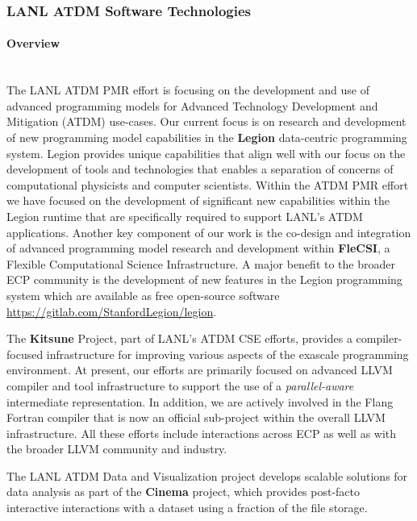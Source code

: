 \subsubsection{ LANL ATDM Software Technologies}

\paragraph{Overview} \leavevmode \\

The LANL ATDM PMR effort is focusing on the development and use of
advanced programming models for Advanced Technology Development and
Mitigation (ATDM) use-cases. Our current focus is on research and development
of new programming model capabilities in the \textbf{Legion} data-centric
programming system. Legion provides unique capabilities that align
well with our focus on the development of tools and technologies that
enables a separation of concerns of computational physicists and
computer scientists. Within the ATDM PMR effort we have focused on the
development of significant new capabilities within the Legion runtime
that are specifically required to support LANL's ATDM
applications. Another key component of our work is the co-design and
integration of advanced programming model research and development
within \textbf{FleCSI}, a Flexible Computational Science Infrastructure. A
major benefit to the broader ECP community is the development of new 
features in the Legion programming system which are available as free
open-source software \url{https://gitlab.com/StanfordLegion/legion}.  

The \textbf{Kitsune} Project, part of LANL's ATDM CSE efforts, provides a
compiler-focused infrastructure for improving various aspects of the
exascale programming environment.  At present, our efforts are primarily
focused on advanced LLVM compiler and tool infrastructure to support the
use of a \emph{parallel-aware} intermediate representation.  In
addition, we are actively involved in the Flang Fortran compiler that
is now an official sub-project within the overall LLVM infrastructure.
All these efforts include interactions across ECP as well as
with the broader LLVM community and industry.  

The LANL ATDM Data and Visualization project develops scalable
solutions for data analysis as part of the \textbf{Cinema} project,
which provides post-facto interactive interactions with a dataset
using a fraction of the file storage. 

